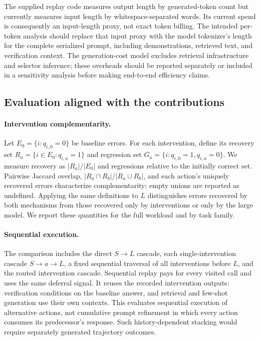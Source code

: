 \documentclass[sigconf]{acmart}
\begin{document}
The supplied replay code measures output length by generated-token count but currently measures input length by whitespace-separated words. Its current spend is consequently an input-length proxy, not exact token billing. The intended per-token analysis should replace that input proxy with the model tokenizer's length for the complete serialized prompt, including demonstrations, retrieved text, and verification context. The generation-cost model excludes retrieval infrastructure and selector inference; these overheads should be reported separately or included in a sensitivity analysis before making end-to-end efficiency claims.

\subsection{Evaluation aligned with the contributions}

\paragraph{Intervention complementarity.}
Let $E_0=\{i:q_{i,0}=0\}$ be baseline errors. For each intervention, define its recovery set $R_a=\{i\in E_0:q_{i,a}=1\}$ and regression set $G_a=\{i:q_{i,0}=1,q_{i,a}=0\}$. We measure recovery as $|R_a|/|E_0|$ and regressions relative to the initially correct set. Pairwise Jaccard overlap, $|R_a\cap R_b|/|R_a\cup R_b|$, and each action's uniquely recovered errors characterize complementarity; empty unions are reported as undefined. Applying the same definitions to $L$ distinguishes errors recovered by both mechanisms from those recovered only by interventions or only by the large model. We report these quantities for the full workload and by task family.

\paragraph{Sequential execution.}
The comparison includes the direct $S\!\rightarrow\!L$ cascade, each single-intervention cascade $S\!\rightarrow\!a\!\rightarrow\!L$, a fixed sequential traversal of all interventions before $L$, and the routed intervention cascade. Sequential replay pays for every visited call and uses the same deferral signal. It reuses the recorded intervention outputs: verification conditions on the baseline answer, and retrieval and few-shot generation use their own contexts. This evaluates sequential execution of alternative actions, not cumulative prompt refinement in which every action consumes its predecessor's response. Such history-dependent stacking would require separately generated trajectory outcomes.
\end{document}

